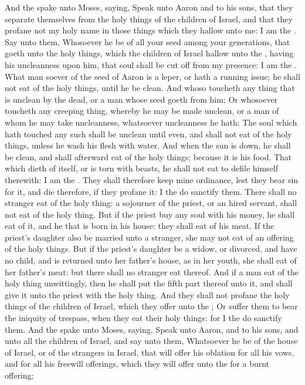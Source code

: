 \begin{biblechapter} %
\verse And the \LORD spake unto Moses, saying,
\verse Speak unto Aaron and to his sons, that they separate themselves from the holy things of the children of Israel, and that they profane not my holy name in those things which they hallow unto me: I am the \LORD.
\verse Say unto them, Whosoever he be of all your seed among your generations, that goeth unto the holy things, which the children of Israel hallow unto the \LORD, having his uncleanness upon him, that soul shall be cut off from my presence: I am the \LORD.
\verse What man soever of the seed of Aaron is a leper, or hath a running issue; he shall not eat of the holy things, until he be clean. And whoso toucheth any thing that is unclean by the dead, or a man whose seed goeth from him;
\verse Or whosoever toucheth any creeping thing, whereby he may be made unclean, or a man of whom he may take uncleanness, whatsoever uncleanness he hath;
\verse The soul which hath touched any such shall be unclean until even, and shall not eat of the holy things, unless he wash his flesh with water.
\verse And when the sun is down, he shall be clean, and shall afterward eat of the holy things; because it is his food.
\verse That which dieth of itself, or is torn with beasts, he shall not eat to defile himself therewith: I am the \LORD.
\verse They shall therefore keep mine ordinance, lest they bear sin for it, and die therefore, if they profane it: I the \LORD do sanctify them.
\verse There shall no stranger eat of the holy thing: a sojourner of the priest, or an hired servant, shall not eat of the holy thing.
\verse But if the priest buy any soul with his money, he shall eat of it, and he that is born in his house: they shall eat of his meat.
\verse If the priest's daughter also be married unto a stranger, she may not eat of an offering of the holy things.
\verse But if the priest's daughter be a widow, or divorced, and have no child, and is returned unto her father's house, as in her youth, she shall eat of her father's meat: but there shall no stranger eat thereof.
\verse And if a man eat of the holy thing unwittingly, then he shall put the fifth part thereof unto it, and shall give it unto the priest with the holy thing.
\verse And they shall not profane the holy things of the children of Israel, which they offer unto the \LORD;
\verse Or suffer them to bear the iniquity of trespass, when they eat their holy things: for I the \LORD do sanctify them.
 And the \LORD spake unto Moses, saying,
\verse Speak unto Aaron, and to his sons, and unto all the children of Israel, and say unto them, Whatsoever he be of the house of Israel, or of the strangers in Israel, that will offer his oblation for all his vows, and for all his freewill offerings, which they will offer unto the \LORD for a burnt offering;

\end{biblechapter}
